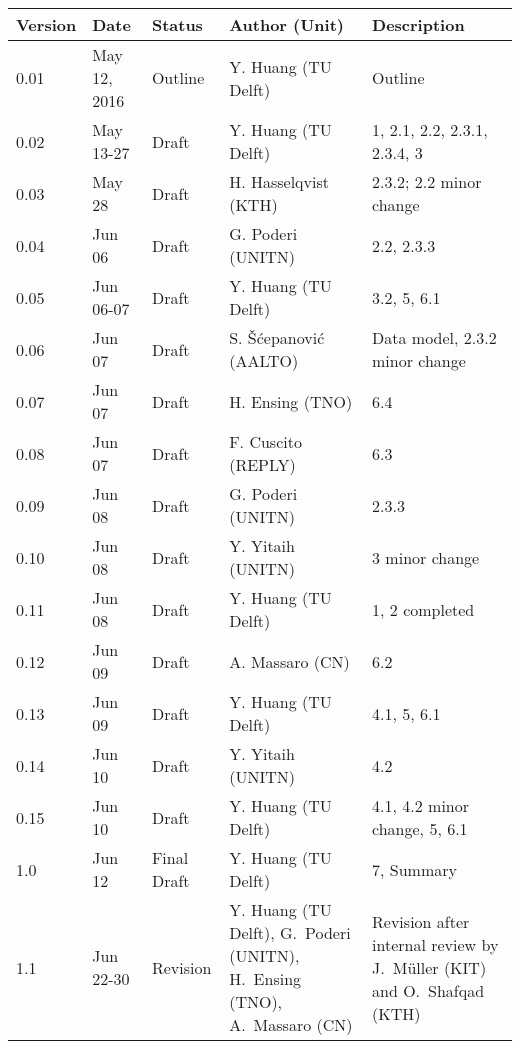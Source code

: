 {\small
\begin{tabularx}{\textwidth}{|l|l|l|>{\raggedright\arraybackslash}p{4cm}|X|}
\hline
\textbf{Version}	& \textbf{Date} &	\textbf{Status} &	\textbf{Author (Unit)} &	\textbf{Description}  \\ \hline
0.01 & May 12, 2016 & Outline & Y. Huang (TU Delft) & Outline\\ \hline
0.02 & May 13-27 & Draft & Y. Huang (TU Delft) & 1, 2.1, 2.2, 2.3.1, 2.3.4, 3\\ \hline
0.03 & May 28 & Draft & H. Hasselqvist (KTH) &  2.3.2; 2.2 minor change\\ \hline
0.04 & Jun 06 & Draft &  G. Poderi (UNITN) & 2.2, 2.3.3 \\ \hline
0.05 & Jun 06-07 & Draft & Y. Huang (TU Delft) & 3.2, 5, 6.1 \\ \hline
0.06 & Jun 07 & Draft &  S. \v{S}\'{c}epanovi\'{c} (AALTO) & Data model, 2.3.2 minor change \\ \hline
0.07 & Jun 07 & Draft &  H. Ensing (TNO) & 6.4 \\ \hline
0.08 & Jun 07 & Draft &  F. Cuscito (REPLY) & 6.3 \\ \hline
0.09 & Jun 08 & Draft &  G. Poderi (UNITN) & 2.3.3 \\ \hline
0.10 & Jun 08 & Draft &  Y. Yitaih (UNITN) & 3 minor change \\ \hline
0.11 & Jun 08 & Draft & Y. Huang (TU Delft) & 1, 2 completed \\ \hline
0.12 & Jun 09 & Draft & A. Massaro  (CN) & 6.2 \\ \hline
0.13 & Jun 09 & Draft & Y. Huang (TU Delft) & 4.1, 5, 6.1 \\ \hline
0.14 & Jun 10 & Draft & Y. Yitaih (UNITN) & 4.2 \\ \hline
0.15 & Jun 10 & Draft & Y. Huang (TU Delft) & 4.1, 4.2 minor change, 5, 6.1 \\ \hline
1.0 & Jun 12 & Final Draft & Y. Huang (TU Delft) & 7, Summary \\ \hline
1.1 & Jun 22-30 & Revision & Y. Huang (TU Delft), G.~Poderi (UNITN),  H.~Ensing (TNO), A.~Massaro  (CN)  & Revision after internal review by  J.~M\"uller (KIT) and O.~Shafqad (KTH) \\ \hline
\end{tabularx}
}


